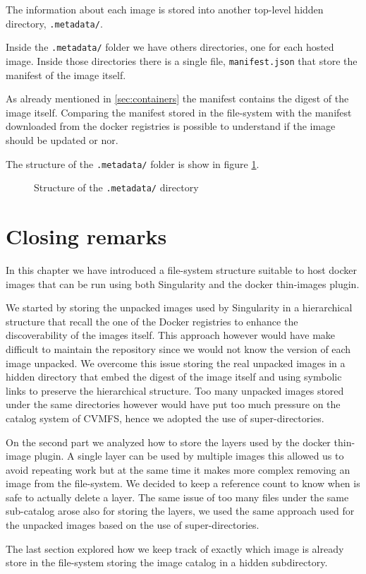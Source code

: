 The information about each image is stored into another top-level hidden
directory, \texttt{.metadata/}.

Inside the \texttt{.metadata/} folder we have others directories, one for each
hosted image.  Inside those directories there is a single file,
\texttt{manifest.json} that store the manifest of the image itself.

As already mentioned in \ref{sec:containers} the
manifest contains the digest of the image itself.  Comparing the manifest
stored in the file-system with the manifest downloaded from the docker
registries is possible to understand if the image should be updated or nor.

The structure of the \texttt{.metadata/} folder is show in figure
\ref{fig:metadata-folder-structure}.

\begin{figure}
\caption{Structure of the \texttt{.metadata/} directory}
\label{fig:metadata-folder-structure}
\end{figure}

\section{Closing remarks}

In this chapter we have introduced a file-system structure suitable to host
docker images that can be run using both Singularity and the docker thin-images
plugin.

We started by storing the unpacked images used by Singularity in a hierarchical
structure that recall the one of the Docker registries to enhance the
discoverability of the images itself. This approach however would have make
difficult to maintain the repository since we would not know the version of
each image unpacked. We overcome this issue storing the real unpacked images in
a hidden directory that embed the digest of the image itself and using symbolic
links to preserve the hierarchical structure. Too many unpacked images stored
under the same directories however would have put too much pressure on the
catalog system of CVMFS, hence we adopted the use of super-directories.

On the second part we analyzed how to store the layers used by the docker
thin-image plugin. A single layer can be used by multiple images this allowed
us to avoid repeating work but at the same time it makes more complex removing
an image from the file-system. We decided to keep a reference count to know
when is safe to actually delete a layer. The same issue of too many files under
the same sub-catalog arose also for storing the layers, we used the same
approach used for the unpacked images based on the use of super-directories.

The last section explored how we keep track of exactly which image is already
store in the file-system storing the image catalog in a hidden subdirectory.
